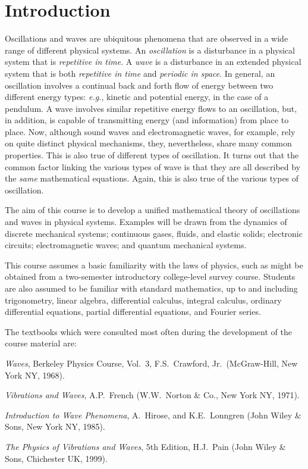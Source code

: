 \chapter{Introduction}
Oscillations and waves
are  ubiquitous phenomena that are observed in a wide range of different  physical systems.
An {\em oscillation}\/ is a disturbance in a physical system that is {\em repetitive in time}. A {\em wave}\/ is a disturbance in an extended physical system that
is both {\em repetitive in time}\/ and {\em periodic in space}. 
In general, an oscillation
involves a continual back and forth flow of energy between two different energy types: {\em e.g.},
kinetic and potential energy, in the case of a pendulum. A wave 
involves similar repetitive energy flows to an oscillation, but, in addition, is
capable of transmitting energy (and information) from place to place.  Now, although sound waves and electromagnetic
waves, for example, rely on quite distinct physical mechanisms, they, nevertheless, share
many common properties. This is also true of different types of oscillation. It turns
out that the common factor linking the various types of wave is that they are all described by the {\em same}\/
mathematical equations. Again, this is also true of  the various types of oscillation.

 The aim of this course is  to develop a unified mathematical theory of
oscillations and waves in physical systems.  Examples will be drawn from the dynamics of discrete mechanical systems;  continuous gases, fluids, and elastic solids; electronic
circuits; electromagnetic waves; and quantum mechanical systems. 

This course assumes a basic  familiarity with the laws of physics, such
as might be obtained from a two-semester introductory college-level survey course. Students
are also assumed to be familiar with standard mathematics, up to and including
trigonometry, linear algebra, differential calculus, integral calculus,  ordinary differential equations,
partial differential equations, and Fourier series. 

The textbooks   which were consulted most often during the development of the
course material are:
\begin{description}
\item {\em Waves}, Berkeley Physics Course, Vol.~3, F.S.~Crawford, Jr.\ (McGraw-Hill, New York NY, 1968).
\item {\em Vibrations and Waves}, A.P.~French (W.W.~Norton \& Co., New York NY, 1971).
\item {\em Introduction to Wave Phenomena}, A.~Hirose, and K.E.~Lonngren (John
Wiley \& Sons, New York NY, 1985).
\item {\em The Physics of Vibrations and Waves}, 5th Edition, H.J.~Pain (John Wiley \& Sons, Chichester UK, 1999). 
\end{description}